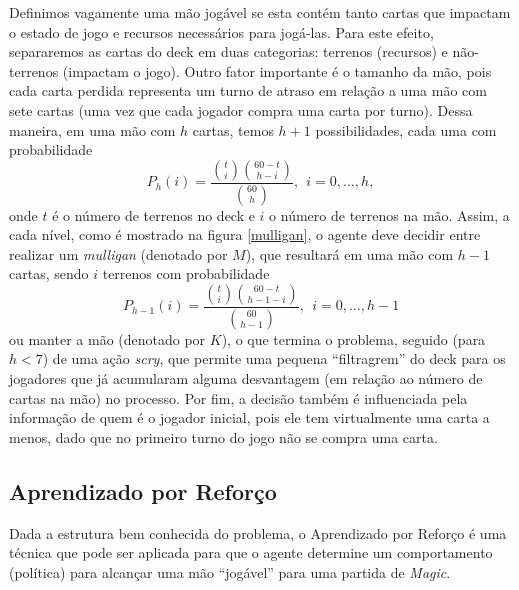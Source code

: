 \documentclass{book}
\begin{document}
Definimos vagamente uma mão jogável se esta contém tanto cartas que
impactam o estado de jogo e recursos necessários para jogá-las.
Para este efeito, separaremos as cartas do deck em duas categorias:
terrenos (recursos) e não-terrenos (impactam o jogo).
Outro fator importante é o tamanho da mão, pois cada carta perdida
representa um turno de atraso em relação a uma mão com sete cartas (uma
vez que cada jogador compra
uma carta por turno). Dessa maneira, em uma mão com $h$ cartas, temos
$h+1$ possibilidades, cada uma com probabilidade
\begin{equation} \label{eq:stateprob} P_h(i) = \frac{\binom{t}{i}\binom{60 - t}{h - i}}{\binom{60}{h}}, \ \
i = 0,\ldots, h, \end{equation} onde $t$ é o número de terrenos no deck e $i$ o
número de terrenos
na mão. Assim, a cada nível, como é mostrado na figura \ref{mulligan}, o
agente deve decidir entre realizar um \textit{mulligan}
(denotado por $M$), que resultará em uma mão com $h-1$ cartas, sendo $i$
terrenos com probabilidade
 \[ P_{h - 1}(i) = \frac{\binom{t}{i}\binom{60 - t}{h - 1 -
i}}{\binom{60}{h - 1}}, \ \  i = 0,\ldots, h - 1\]
 ou manter a mão (denotado por $K$), o que termina o problema, seguido
(para $h < 7$) de uma ação \textit{scry}, que permite uma pequena
``filtragrem''
 do deck para os jogadores que já acumularam alguma desvantagem (em
relação ao número de cartas na mão) no processo. Por fim, a decisão
também é influenciada
 pela informação de quem é o jogador inicial, pois ele tem virtualmente
uma carta a menos, dado que no primeiro turno do jogo não se compra uma
carta.

\subsection{Aprendizado por Reforço}


Dada a estrutura bem conhecida do problema, o Aprendizado por Reforço é
uma técnica que pode ser aplicada
para que o agente determine um comportamento (política) para alcançar
uma mão ``jogável'' para uma partida de \textit{Magic}.
\end{document}
